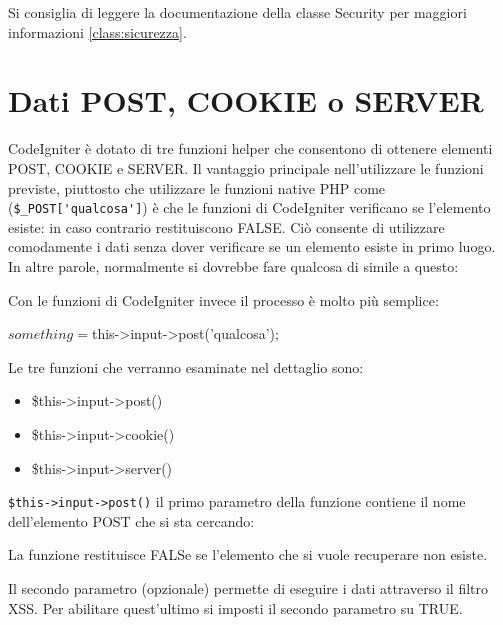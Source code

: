 
Si consiglia di leggere la documentazione della classe Security per maggiori informazioni \vref{class:sicurezza}.

\section*{Dati POST, COOKIE o SERVER}
CodeIgniter è dotato di tre funzioni helper che consentono di ottenere elementi POST, COOKIE e SERVER. Il vantaggio principale nell'utilizzare le funzioni previste, piuttosto che utilizzare le funzioni native \ac{PHP} come (\verb|$_POST['qualcosa']|) è che le funzioni di CodeIgniter verificano se l'elemento esiste: in caso contrario restituiscono FALSE. Ciò consente di utilizzare comodamente i dati senza dover verificare se un elemento esiste in primo luogo. In altre parole, normalmente si dovrebbe fare qualcosa di simile a questo:


Con le funzioni di CodeIgniter invece il processo è molto più semplice:

\begin{code}
$something = $this->input->post('qualcosa');
\end{code}

Le tre funzioni che verranno esaminate nel dettaglio sono:

\begin{itemize}
\item \$this->input->post()
\item \$this->input->cookie()
\item \$this->input->server()
\end{itemize}

\verb|$this->input->post()| il primo parametro della funzione contiene il nome dell'elemento POST che si sta cercando:


La funzione restituisce FALSe se l'elemento che si vuole recuperare non esiste. 

Il secondo parametro (opzionale) permette di eseguire i dati attraverso il filtro \ac{XSS}. Per abilitare quest'ultimo si imposti il secondo parametro su TRUE.

